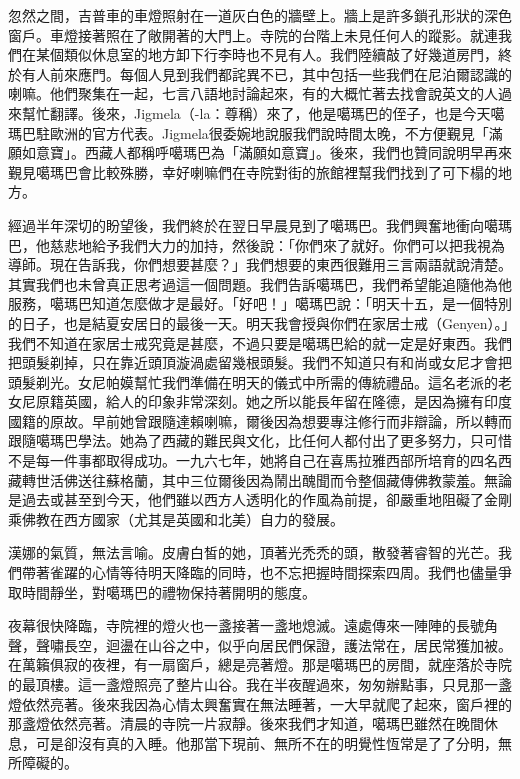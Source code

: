 
忽然之間，吉普車的車燈照射在一道灰白色的牆壁上。牆上是許多鎖孔形狀的深色窗戶。車燈接著照在了敞開著的大門上。寺院的台階上未見任何人的蹤影。就連我們在某個類似休息室的地方卸下行李時也不見有人。我們陸續敲了好幾道房門，終於有人前來應門。每個人見到我們都詫異不已，其中包括一些我們在尼泊爾認識的喇嘛。他們聚集在一起，七言八語地討論起來，有的大概忙著去找會說英文的人過來幫忙翻譯。後來，Jigmela（-la：尊稱）來了，他是噶瑪巴的侄子，也是今天噶瑪巴駐歐洲的官方代表。Jigmela很委婉地說服我們說時間太晚，不方便覲見「滿願如意寶」。西藏人都稱呼噶瑪巴為「滿願如意寶」。後來，我們也贊同說明早再來覲見噶瑪巴會比較殊勝，幸好喇嘛們在寺院對街的旅館裡幫我們找到了可下榻的地方。


經過半年深切的盼望後，我們終於在翌日早晨見到了噶瑪巴。我們興奮地衝向噶瑪巴，他慈悲地給予我們大力的加持，然後說：「你們來了就好。你們可以把我視為導師。現在告訴我，你們想要甚麼？」我們想要的東西很難用三言兩語就說清楚。其實我們也未曾真正思考過這一個問題。我們告訴噶瑪巴，我們希望能追隨他為他服務，噶瑪巴知道怎麼做才是最好。「好吧！」噶瑪巴說：「明天十五，是一個特別的日子，也是結夏安居日的最後一天。明天我會授與你們在家居士戒（Genyen）。」我們不知道在家居士戒究竟是甚麼，不過只要是噶瑪巴給的就一定是好東西。我們把頭髮剃掉，只在靠近頭頂漩渦處留幾根頭髮。我們不知道只有和尚或女尼才會把頭髮剃光。女尼帕嫫幫忙我們準備在明天的儀式中所需的傳統禮品。這名老派的老女尼原籍英國，給人的印象非常深刻。她之所以能長年留在隆德，是因為擁有印度國籍的原故。早前她曾跟隨達賴喇嘛，爾後因為想要專注修行而非辯論，所以轉而跟隨噶瑪巴學法。她為了西藏的難民與文化，比任何人都付出了更多努力，只可惜不是每一件事都取得成功。一九六七年，她將自己在喜馬拉雅西部所培育的四名西藏轉世活佛送往蘇格蘭，其中三位爾後因為鬧出醜聞而令整個藏傳佛教蒙羞。無論是過去或甚至到今天，他們雖以西方人透明化的作風為前提，卻嚴重地阻礙了金剛乘佛教在西方國家（尤其是英國和北美）自力的發展。

漢娜的氣質，無法言喻。皮膚白皙的她，頂著光禿禿的頭，散發著睿智的光芒。我們帶著雀躍的心情等待明天降臨的同時，也不忘把握時間探索四周。我們也儘量爭取時間靜坐，對噶瑪巴的禮物保持著開明的態度。


夜幕很快降臨，寺院裡的燈火也一盞接著一盞地熄滅。遠處傳來一陣陣的長號角聲，聲嘯長空，迴盪在山谷之中，似乎向居民們保證，護法常在，居民常獲加被。在萬籟俱寂的夜裡，有一扇窗戶，總是亮著燈。那是噶瑪巴的房間，就座落於寺院的最頂樓。這一盞燈照亮了整片山谷。我在半夜醒過來，匆匆辦點事，只見那一盞燈依然亮著。後來我因為心情太興奮實在無法睡著，一大早就爬了起來，窗戶裡的那盞燈依然亮著。清晨的寺院一片寂靜。後來我們才知道，噶瑪巴雖然在晚間休息，可是卻沒有真的入睡。他那當下現前、無所不在的明覺性恆常是了了分明，無所障礙的。

